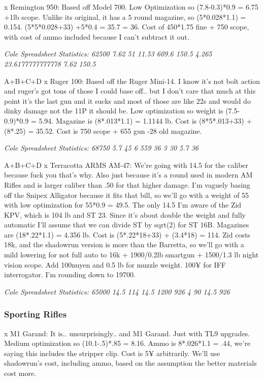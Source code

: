 \begin{multicols*}{2}
	x Remington 950: Based off Model 700.  Low Optimization so (7.8-0.3)*0.9 = 6.75 +1lb scope.   Unlike its original, it has a 5 round magazine, so (5*0.028*1.1) = 0.154. (5*5*0.028+33) +5*0.4 = 35.7 = 36. Cost of 450*1.75 fine + 750 scope, with cost of ammo included because I can't subtract it out. 
	
	\textit{\textcolor{OliveGreen}{Cole Spreadsheet Statistics: 62500 7.62 51 11.53 609.6 150.5 4.265 23.6177777777778 7.62 150.5}}
	
	A+B+C+D
	x Ruger 100: Based off the Ruger Mini-14. I know it's not bolt action and ruger's got tons of those I could base off.. but I don't care that much at this point it's the last gun and it sucks and most of those are like 22s and would do dinky damage not the 11P it should be. Low optimization so weight is (7.5-0.9)*0.9 = 5.94. Magazine is (8*.013*1.1) = 1.1144 lb. Cost is (8*5*.013+33) + (8*.25) = 35.52. Cost is 750 scope + 655 gun -28 old magazine.
	
	\textit{\textcolor{OliveGreen}{Cole Spreadsheet Statistics: 68750 5.7 45 6 559 36 3 30 5.7 36}}
	
	A+B+C+D
	x Terracotta ARMS AM-47:  We're going with 14.5 for the caliber because fuck you that's why. Also just because it's a round used in modern AM Rifles and is larger caliber than .50 for that higher damage. I'm vaguely basing off the Snipex Alligator because it fits that bill, so we'll go with a weight of 55 with low optimization for 55*0.9 = 49.5. The only 14.5 I'm aware of the \GURPS Zid KPV, which is 104 lb and ST 23.  Since it's about double the weight and fully automatic I'll assume that we can divide ST by sqrt(2)  for ST 16B. Magazines are (18*.22*1.1) =  4.356 lb. Cost is (5*.22*18+33) + (3.4*18) = 114. Zid costs 18k,  and the shadowrun version is more than the Barretta, so we'll go with a mild lowering for not full auto to 16k + 1900/0.2lb smartgun + 1500/1.3 lb night vision scope. Add 100nuyen and 0.5 lb for muzzle weight. 100¥ for IFF interrogator. I'm rounding down to 19700.
	
	\textit{\textcolor{OliveGreen}{Cole Spreadsheet Statistics: 65000 14.5 114 14.5 1200 926 4 90 14.5 926}}

	\subsubsection{Sporting Rifles}
	
	x M1 Garand: It is.. unsurprisingly.. and M1 Garand. Just with TL9 upgrades. Medium optimization so (10.1-.5)*.85 = 8.16. Ammo is 8*.026*1.1 = .44, we're saying this includes the stripper clip. Cost is 5¥ arbitrarily. We'll use shadowrun's cost, including ammo, based on the assumption the better materials cost more.
	

\end{multicols*}

